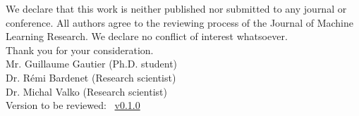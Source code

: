 \documentclass[twoside,11pt]{article}
\begin{document}
We declare that this work is neither published nor submitted to any journal or conference.
All authors agree to the reviewing process of the Journal of Machine Learning Research.
We declare no conflict of interest whatsoever.\\

Thank you for your consideration.\\

Mr. Guillaume Gautier (Ph.D. student)\\
\indent Dr. Rémi Bardenet (Research scientist)\\
\indent Dr. Michal Valko (Research scientist)\\

Version to be reviewed: \DPPy\ \href{https://github.com/guilgautier/DPPy/tags}{v0.1.0}
\end{document}
